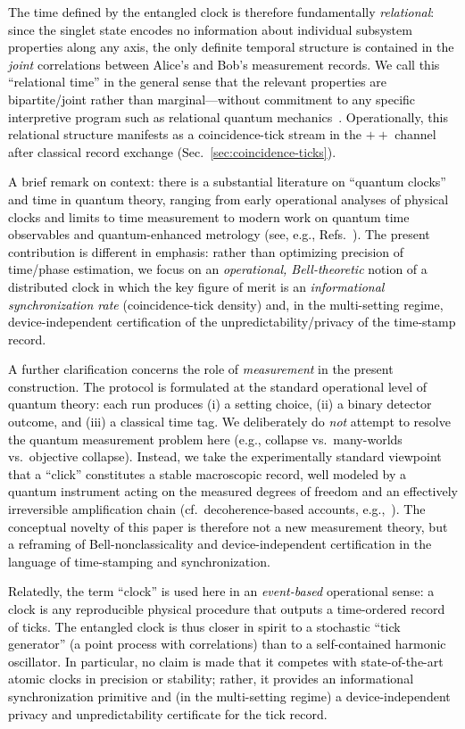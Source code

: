 \documentclass[reprint,aps,pra,longbibliography]{revtex4-2}
\newcommand{\rev}[1]{\textcolor{black}{#1}} %
\newcommand{\revG}[1]{\textcolor{black}{#1}} %
\newcommand{\revA}[1]{\textcolor{black}{#1}} %
\begin{document}
\revA{The time defined by the entangled clock is therefore fundamentally \emph{relational}: since the singlet state encodes no information about individual subsystem properties along any axis, the only definite temporal structure is contained in the \emph{joint} correlations between Alice's and Bob's measurement records. We call this ``relational time'' in the general sense that the relevant properties are bipartite/joint rather than marginal---without commitment to any specific interpretive program such as relational quantum mechanics~\cite{Rovelli1996}. Operationally, this relational structure manifests as a coincidence-tick stream in the $++$ channel after classical record exchange (Sec.~\ref{sec:coincidence-ticks}).}

\rev{A brief remark on context: there is a substantial literature on ``quantum clocks'' and time in quantum theory, ranging from early operational analyses of physical clocks and limits to time measurement to modern work on quantum time observables and quantum-enhanced metrology (see, e.g., Refs.~\cite{SaleckerWigner1958,Busch2008Time,Giovannetti2004,Moreva2014}). The present contribution is different in emphasis: rather than optimizing precision of time/phase estimation, we focus on an \emph{operational, Bell-theoretic} notion of a distributed clock in which the key figure of merit is an \emph{informational synchronization rate} (coincidence-tick density) and, in the multi-setting regime, device-independent certification of the unpredictability/privacy of the time-stamp record.}

\revG{A further clarification concerns the role of \emph{measurement} in the present construction. The protocol is formulated at the standard operational level of quantum theory: each run produces (i) a setting choice, (ii) a binary detector outcome, and (iii) a classical time tag. We deliberately do \emph{not} attempt to resolve the quantum measurement problem here (e.g., collapse vs.\ many-worlds vs.\ objective collapse). Instead, we take the experimentally standard viewpoint that a ``click'' constitutes a stable macroscopic record, well modeled by a quantum instrument acting on the measured degrees of freedom and an effectively irreversible amplification chain (cf.\ decoherence-based accounts, e.g.,~\cite{Schlosshauer2007}). The conceptual novelty of this paper is therefore not a new measurement theory, but a reframing of Bell-nonclassicality and device-independent certification in the language of time-stamping and synchronization.}

\revG{Relatedly, the term ``clock'' is used here in an \emph{event-based} operational sense: a clock is any reproducible physical procedure that outputs a time-ordered record of ticks. The entangled clock is thus closer in spirit to a stochastic ``tick generator'' (a point process with correlations) than to a self-contained harmonic oscillator. In particular, no claim is made that it competes with state-of-the-art atomic clocks in precision or stability; rather, it provides an informational synchronization primitive and (in the multi-setting regime) a device-independent privacy and unpredictability certificate for the tick record.}
\end{document}
